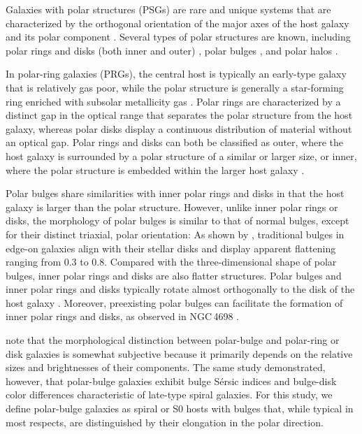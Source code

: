\documentclass[letter]{aa}
\begin{document}
Galaxies with polar structures (PSGs) are rare and unique systems that are characterized by the orthogonal orientation of the major axes of the host galaxy and its polar component \citep{1990AJ....100.1489W, moiseev11, 2012MNRAS.422.2386F, 2015MNRAS.447.2287R}. Several types of polar structures are known, including polar rings and disks (both inner and outer) \citep{1999ApJ...519L.127B, 2020MNRAS.497.2039M}, polar bulges \citep{2012AstBu..67..147M, 2015AstL...41..748R}, and polar halos \citep{2016ApJ...823...19C, 2020MNRAS.494.1751M, 2021MNRAS.506.5030M}.

In polar-ring galaxies (PRGs), the central host is typically an early-type galaxy that is relatively gas poor, while the polar structure is generally a star-forming ring enriched with subsolar metallicity gas \citep{2010ApJ...714.1081S, 2015A&A...583A..48I, 2019MNRAS.486.4186E}. Polar rings are characterized by a distinct gap in the optical range that separates the polar structure from the host galaxy, whereas polar disks display a continuous distribution of material without an optical gap. Polar rings and disks can both be classified as outer, where the host galaxy is surrounded by a polar structure of a similar or larger size, or inner, where the polar structure is embedded within the larger host galaxy \citep[see e.g.][]{1990AJ....100.1489W, 2012AstBu..67..147M}. 

Polar bulges share similarities with inner polar rings and disks in that the host galaxy is larger than the polar structure. However, unlike inner polar rings or disks, the morphology of polar bulges is similar to that of normal bulges, except for their distinct triaxial, polar orientation: As shown by \citealt{2010MNRAS.401..559M,2012A&AT...27..325S}, traditional bulges in edge-on galaxies align with their stellar disks and display apparent flattening ranging from 0.3 to 0.8. Compared with the three-dimensional shape of polar bulges, inner polar rings and disks are also flatter structures. Polar bulges and inner polar rings and disks typically rotate almost orthogonally to the disk of the host galaxy \citep{2012AstBu..67..147M, 2015AstL...41..748R}. Moreover, preexisting polar bulges can facilitate the formation of inner polar rings and disks, as observed in NGC\,4698 \citep{2012MNRAS.423L..79C}.

\citet{2015AstL...41..748R} note that the morphological distinction between polar-bulge and polar-ring or disk galaxies is somewhat subjective because it primarily depends on the relative sizes and brightnesses of their components. The same study demonstrated, however, that polar-bulge galaxies exhibit bulge S\'ersic indices and bulge-disk color differences characteristic of late-type spiral galaxies. For this study, we define polar-bulge galaxies as spiral or S0 hosts with bulges that, while typical in most respects, are distinguished by their elongation in the polar direction.
\end{document}
